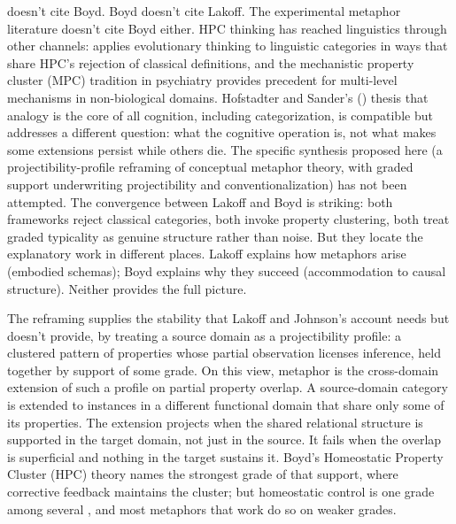 \documentclass[12pt]{article}
\begin{document}
\textcite{lakoff1987} doesn't cite Boyd. Boyd doesn't cite Lakoff. The experimental metaphor literature \citep{flusberg2018, flusberg2024, thibodeau2019, holyoak2018} doesn't cite Boyd either. HPC thinking has reached linguistics through other channels: \textcite{croft2000} applies evolutionary thinking to linguistic categories in ways that share HPC's rejection of classical definitions, and the mechanistic property cluster (MPC) tradition in psychiatry \citep{kendler2011} provides precedent for multi-level mechanisms in non-biological domains. Hofstadter and Sander's (\citeyear{hofstadter2013}) thesis that analogy is the core of all cognition, including categorization, is compatible but addresses a different question: what the cognitive operation is, not what makes some extensions persist while others die. The specific synthesis proposed here (a projectibility-profile reframing of conceptual metaphor theory, with graded support underwriting projectibility and conventionalization) has not been attempted. The convergence between Lakoff and Boyd is striking: both frameworks reject classical categories, both invoke property clustering, both treat graded typicality as genuine structure rather than noise. But they locate the explanatory work in different places. Lakoff explains how metaphors arise (embodied schemas); Boyd explains why they succeed (accommodation to causal structure). Neither provides the full picture.

The reframing supplies the stability that Lakoff and Johnson's account needs but doesn't provide, by treating a source domain as a projectibility profile: a clustered pattern of properties whose partial observation licenses inference, held together by support of some grade. On this view, metaphor is the cross-domain extension of such a profile on partial property overlap. A source-domain category is extended to instances in a different functional domain that share only some of its properties. The extension projects when the shared relational structure is supported in the target domain, not just in the source. It fails when the overlap is superficial and nothing in the target sustains it. Boyd's Homeostatic Property Cluster (HPC) theory names the strongest grade of that support, where corrective feedback maintains the cluster; but homeostatic control is one grade among several \citep{reynolds2026kindsProjectibilityProfiles}, and most metaphors that work do so on weaker grades.
\end{document}
